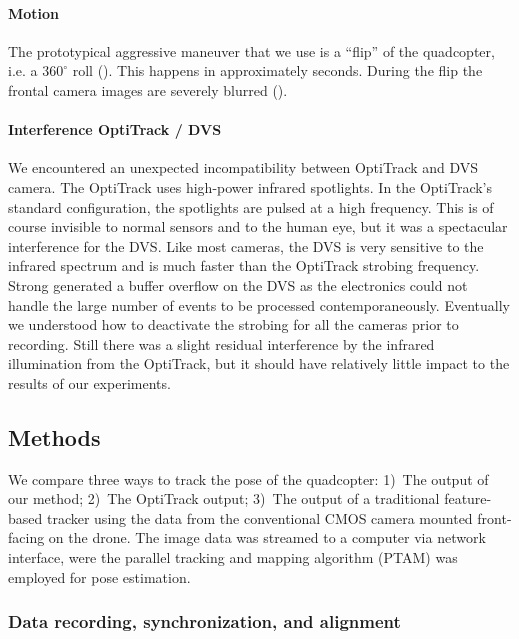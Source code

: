 \paragraph{Motion}

The prototypical aggressive maneuver that we use is a ``flip'' of
the quadcopter, i.e. a $360^{\circ}$ roll ().
This happens in approximately \xxx seconds. During the flip the frontal
camera images are severely blurred (). 




\paragraph{Interference OptiTrack / DVS}

We encountered an unexpected incompatibility between OptiTrack and
DVS camera. The OptiTrack uses high-power infrared spotlights. In
the OptiTrack's standard configuration, the spotlights are pulsed
at a high frequency. This is of course invisible to normal sensors
and to the human eye, but it was a spectacular interference for the
DVS. Like most cameras, the DVS is very sensitive to the infrared
spectrum and is much faster than the OptiTrack strobing frequency.
Strong generated a buffer overflow on the DVS as the electronics could
not handle the large number of events to be processed contemporaneously.
Eventually we understood how to deactivate the strobing for all the
cameras prior to recording. Still there was a slight residual interference
by the infrared illumination from the OptiTrack, but it should have
relatively little impact to the results of our experiments.


\subsection{Methods}

We compare three ways to track the pose of the quadcopter: 1)~The
output of our method; 2)~The OptiTrack output; 3)~The output of
a traditional feature-based tracker using the data from the conventional
CMOS camera mounted front-facing on the drone. The image data was
streamed to a computer via network interface, were the parallel tracking
and mapping algorithm (PTAM)\cite{PTAM} was employed for pose estimation.


\subsubsection{Data recording, synchronization, and alignment\label{sec:datarecording}}

